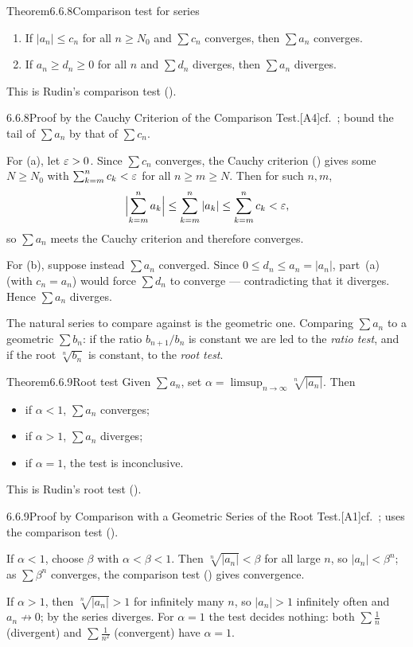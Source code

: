 \documentclass[main.tex]{subfiles}
\begin{document}
\begin{Obj}{Theorem}{6.6.8}{Comparison test for series}
\begin{enumerate}[label=\textup{(\alph*)},leftmargin=2em,topsep=2pt,itemsep=2pt]
  \item If $|a_n|\le c_n$ for all $n\ge N_0$ and $\sum c_n$ converges, then $\sum a_n$ converges.
  \item If $a_n\ge d_n\ge0$ for all $n$ and $\sum d_n$ diverges, then $\sum a_n$ diverges.
\end{enumerate}
This is Rudin's comparison test ().
\end{Obj}
\begin{Prf}{6.6.8}{Proof by the Cauchy Criterion of the Comparison Test.}{[A4]\quad cf.\ ; bound the tail of $\sum a_n$ by that of $\sum c_n$.}
\item For (a), let $\varepsilon>0$. Since $\sum c_n$ converges, the Cauchy criterion () gives some $N\ge N_0$ with $\sum_{k=m}^n c_k<\varepsilon$ for all $n\ge m\ge N$. Then for such $n,m$,
  \[ \Bigl|\sum_{k=m}^n a_k\Bigr| \le \sum_{k=m}^n |a_k| \le \sum_{k=m}^n c_k < \varepsilon , \]
  so $\sum a_n$ meets the Cauchy criterion and therefore converges.
\item For (b), suppose instead $\sum a_n$ converged. Since $0\le d_n\le a_n=|a_n|$, part~(a) (with $c_n=a_n$) would force $\sum d_n$ to converge --- contradicting that it diverges. Hence $\sum a_n$ diverges.
\end{Prf}

\noindent The natural series to compare against is the geometric one. Comparing $\sum a_n$ to a
geometric $\sum b_n$: if the ratio $b_{n+1}/b_n$ is constant we are led to the \emph{ratio test},
and if the root $\sqrt[n]{b_n}$ is constant, to the \emph{root test}.

\begin{Obj}{Theorem}{6.6.9}{Root test}
Given $\sum a_n$, set $\alpha=\limsup_{n\to\infty}\sqrt[n]{|a_n|}$. Then
\begin{itemize}[leftmargin=1.3em,topsep=2pt,itemsep=1pt,label=\textbullet]
  \item if $\alpha<1$, $\sum a_n$ converges;
  \item if $\alpha>1$, $\sum a_n$ diverges;
  \item if $\alpha=1$, the test is inconclusive.
\end{itemize}
This is Rudin's root test ().
\end{Obj}
\begin{Prf}{6.6.9}{Proof by Comparison with a Geometric Series of the Root Test.}{[A1]\quad cf.\ ; uses the comparison test ().}
\item If $\alpha<1$, choose $\beta$ with $\alpha<\beta<1$. Then $\sqrt[n]{|a_n|}<\beta$ for all large $n$, so $|a_n|<\beta^n$; as $\sum\beta^n$ converges, the comparison test () gives convergence.
\item If $\alpha>1$, then $\sqrt[n]{|a_n|}>1$ for infinitely many $n$, so $|a_n|>1$ infinitely often and $a_n\not\to0$; by  the series diverges. For $\alpha=1$ the test decides nothing: both $\sum\frac1n$ (divergent) and $\sum\frac1{n^2}$ (convergent) have $\alpha=1$.
\end{Prf}
\end{document}
